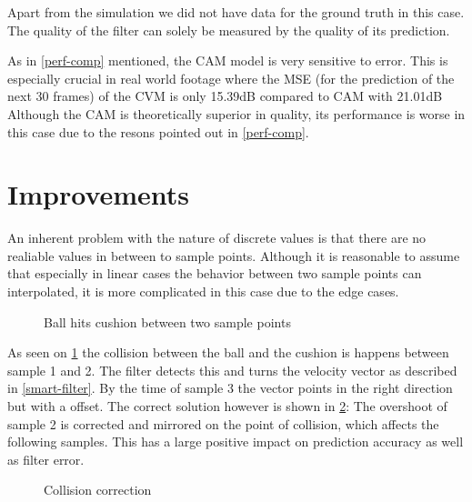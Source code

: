 \documentclass[notitlepage, a4paper, 11pt]{scrartcl}
\begin{document}
\begin{multicols}{2}
Apart from the simulation we did not have data for the ground truth in this case. 
The quality of the filter can solely be measured by the quality of its prediction. 

As in \cref{perf-comp} mentioned, the CAM model is very sensitive to error. This is especially crucial in real world footage where the MSE (for the prediction of the next 30 frames) of the CVM is only 15.39dB compared to CAM with 21.01dB
Although the CAM is theoretically superior in quality, its performance is worse in this case due to the resons pointed out in \cref{perf-comp}.

\section{Improvements}

An inherent problem with the nature of discrete values is that there are no realiable values in between to sample points. 
Although it is reasonable to assume that especially in linear cases the behavior between two sample points can interpolated, 
it is more complicated in this case due to the edge cases.

\begin{figure}[H]
    \centering
    \caption{Ball hits cushion between two sample points}
    \label{fig:edge-case}
\end{figure}

As seen on \cref{fig:edge-case} the collision between the ball and the cushion is happens between sample 1 and 2. 
The filter detects this and turns the velocity vector as described in \cref{smart-filter}.
By the time of sample 3 the vector points in the right direction but with a offset. The correct solution however is shown in \cref{fig:edge-case-sol}:
The overshoot of sample 2 is corrected and mirrored on the point of collision, which affects the following samples. This has a large positive impact on prediction accuracy as well as filter error.

\begin{figure}[H]
    \centering
    \caption{Collision correction}
    \label{fig:edge-case-sol}
\end{figure}


\end{multicols}
\end{document}
